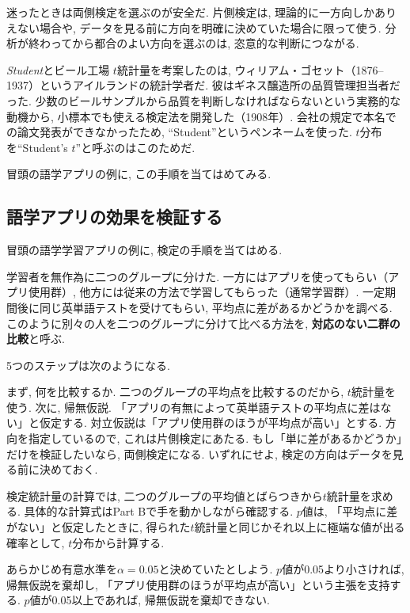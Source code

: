     迷ったときは両側検定を選ぶのが安全だ.
    片側検定は, 理論的に一方向しかありえない場合や, データを見る前に方向を明確に決めていた場合に限って使う.
    分析が終わってから都合のよい方向を選ぶのは, 恣意的な判断につながる.

    \begin{mybox}{\textit{Student}とビール工場}
      $t$統計量を考案したのは, ウィリアム・ゴセット（1876--1937）というアイルランドの統計学者だ.
      彼はギネス醸造所の品質管理担当者だった.
      少数のビールサンプルから品質を判断しなければならないという実務的な動機から,
      小標本でも使える検定法を開発した（1908年）.
      会社の規定で本名での論文発表ができなかったため, ``Student''というペンネームを使った.
      $t$分布を``Student's $t$''と呼ぶのはこのためだ.
    \end{mybox}

    冒頭の語学アプリの例に, この手順を当てはめてみる.


  \subsection{語学アプリの効果を検証する}

    冒頭の語学学習アプリの例に, 検定の手順を当てはめる.

    学習者を無作為に二つのグループに分けた.
    一方にはアプリを使ってもらい（アプリ使用群）,
    他方には従来の方法で学習してもらった（通常学習群）.
    一定期間後に同じ英単語テストを受けてもらい, 平均点に差があるかどうかを調べる.
    このように別々の人を二つのグループに分けて比べる方法を, \textbf{対応のない二群の比較}と呼ぶ.

    5つのステップは次のようになる.

    まず, 何を比較するか. 二つのグループの平均点を比較するのだから, $t$統計量を使う.
    次に, 帰無仮説. 「アプリの有無によって英単語テストの平均点に差はない」と仮定する.
    対立仮説は「アプリ使用群のほうが平均点が高い」とする.
    方向を指定しているので, これは片側検定にあたる.
    もし「単に差があるかどうか」だけを検証したいなら, 両側検定になる.
    いずれにせよ, 検定の方向はデータを見る前に決めておく.

    検定統計量の計算では, 二つのグループの平均値とばらつきから$t$統計量を求める.
    具体的な計算式はPart Bで手を動かしながら確認する.
    $p$値は, 「平均点に差がない」と仮定したときに, 得られた$t$統計量と同じかそれ以上に極端な値が出る確率として, $t$分布から計算する.

    あらかじめ有意水準を$\alpha = 0.05$と決めていたとしよう.
    $p$値が0.05より小さければ, 帰無仮説を棄却し, 「アプリ使用群のほうが平均点が高い」という主張を支持する.
    $p$値が0.05以上であれば, 帰無仮説を棄却できない.

